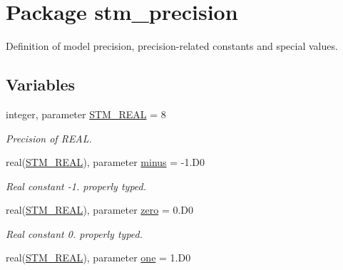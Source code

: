 \hypertarget{a00038}{
\section{Package stm\_\-precision}
\label{a00038}
}
Definition of model precision, precision-related constants and special values.  


\subsection*{Variables}
\begin{CompactItemize}
\item 
\hypertarget{a00038_9b1e7e9d7f36de86830360566a430b08}{
integer, parameter \hyperlink{a00038_9b1e7e9d7f36de86830360566a430b08}{STM\_\-REAL} = 8}
\label{a00038_9b1e7e9d7f36de86830360566a430b08}

\begin{CompactList}\small\item\em Precision of REAL. \item\end{CompactList}\item 
\hypertarget{a00038_89cac4518f57c4417ba5867197e61810}{
real(\hyperlink{a00038_9b1e7e9d7f36de86830360566a430b08}{STM\_\-REAL}), parameter \hyperlink{a00038_89cac4518f57c4417ba5867197e61810}{minus} = -1.D0}
\label{a00038_89cac4518f57c4417ba5867197e61810}

\begin{CompactList}\small\item\em Real constant -1. properly typed. \item\end{CompactList}\item 
\hypertarget{a00038_d966358825b853bc66dedcb2115f2ca1}{
real(\hyperlink{a00038_9b1e7e9d7f36de86830360566a430b08}{STM\_\-REAL}), parameter \hyperlink{a00038_d966358825b853bc66dedcb2115f2ca1}{zero} = 0.D0}
\label{a00038_d966358825b853bc66dedcb2115f2ca1}

\begin{CompactList}\small\item\em Real constant 0. properly typed. \item\end{CompactList}\item 
\hypertarget{a00038_78507c59b2ac20f9541ab0c83832c453}{
real(\hyperlink{a00038_9b1e7e9d7f36de86830360566a430b08}{STM\_\-REAL}), parameter \hyperlink{a00038_78507c59b2ac20f9541ab0c83832c453}{one} = 1.D0}
\label{a00038_78507c59b2ac20f9541ab0c83832c453}


\end{CompactItemize}
